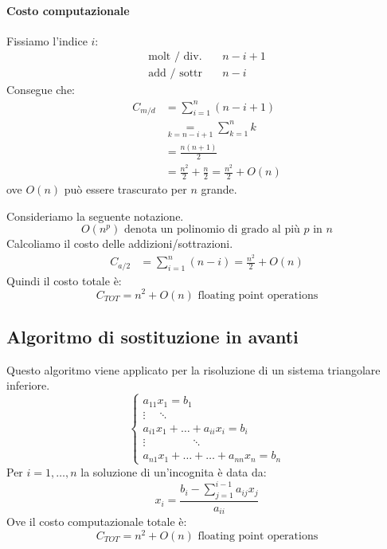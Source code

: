 \documentclass[12pt]{report}
\begin{document}
\paragraph{Costo computazionale} Fissiamo l'indice $i$:
\begin{align*}
	\text{molt / div.} & \quad n - i + 1 \\
	\text{add / sottr} & \quad n - i
\end{align*}
Consegue che:
\begin{align*}
C_{m/d} &= \displaystyle\sum_{i=1}^{n}(n-i+1) \\
&\underset{k=n-i+1}{=}\displaystyle\sum_{k=1}^{n}k  \\
&= \displaystyle\frac{n(n+1)}{2} \\
&= \displaystyle\frac{n^2}{2} + \displaystyle\frac{n}{2} = \displaystyle\frac{n^2}{2} + O(n)
\end{align*}
ove $O(n)$ può essere trascurato per $n$ grande.

Consideriamo la seguente notazione.
\[
O(n^p) \text{ denota un polinomio di grado al più $p$ in $n$}
\]
Calcoliamo il costo delle addizioni/sottrazioni.
\begin{align*}
	C_{a/2} &= \displaystyle\sum_{i=1}^{n}(n-i) = \displaystyle\frac{n^2}{2} + O(n)
\end{align*}
Quindi il costo totale è:
\[
C_{TOT} = n^2 + O(n) \text{ floating point operations}
\]
\subsection{Algoritmo di sostituzione in avanti}
Questo algoritmo viene applicato per la risoluzione di un sistema triangolare inferiore.
\[
\begin{cases}
  a_{11}x_1 = b_1 \\
  \vdots \quad \ddots \\
  a_{i1}x_1 + \dots + a_{ii}x_i = b_i \\
  \vdots \quad \quad \quad \quad \ddots \\
  a_{n1}x_1 + \dots + \dots + a_{nn}x_n = b_n
\end{cases}
\]
Per $i = 1, \dots, n$ la soluzione di un'incognita è data da:
\[
x_i = \displaystyle\frac{b_i - \displaystyle\sum_{j=1}^{i-1}a_{ij}x_j}{a_{ii}}
\]
Ove il costo computazionale totale è:
\[
C_{TOT} = n^2 + O(n) \text{ floating point operations}
\]
\end{document}
